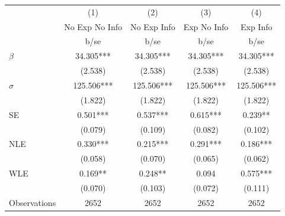 {
\def\sym#1{\ifmmode^{#1}\else\(^{#1}\)\fi}
\begin{tabular}{l*{4}{c}}
\hline\hline
                    &\multicolumn{1}{c}{(1)}&\multicolumn{1}{c}{(2)}&\multicolumn{1}{c}{(3)}&\multicolumn{1}{c}{(4)}\\
                    &\multicolumn{1}{c}{No Exp No Info}&\multicolumn{1}{c}{No Exp Info}&\multicolumn{1}{c}{Exp No Info}&\multicolumn{1}{c}{Exp Info}\\
                    &        b/se   &        b/se   &        b/se   &        b/se   \\
\hline
$\beta$             &      34.305***&      34.305***&      34.305***&      34.305***\\
                    &     (2.538)   &     (2.538)   &     (2.538)   &     (2.538)   \\
$\sigma$            &     125.506***&     125.506***&     125.506***&     125.506***\\
                    &     (1.822)   &     (1.822)   &     (1.822)   &     (1.822)   \\
SE                  &       0.501***&       0.537***&       0.615***&       0.239** \\
                    &     (0.079)   &     (0.109)   &     (0.082)   &     (0.102)   \\
NLE                 &       0.330***&       0.215***&       0.291***&       0.186***\\
                    &     (0.058)   &     (0.070)   &     (0.065)   &     (0.062)   \\
WLE                 &       0.169** &       0.248** &       0.094   &       0.575***\\
                    &     (0.070)   &     (0.103)   &     (0.072)   &     (0.111)   \\
\hline
Observations        &        2652   &        2652   &        2652   &        2652   \\
\hline\hline
\end{tabular}
}
